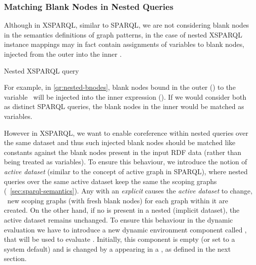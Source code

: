 \subsubsection{Matching Blank Nodes in Nested Queries}
\label{sec:bgpmatch}
%
Although in XSPARQL, similar to SPARQL, we are not considering blank nodes in the semantics definitions of graph
patterns, in the case of nested  XSPARQL instance mappings may in fact contain assignments of
variables to blank nodes, injected from the outer \SparqlForClause into the inner \SparqlForClause.
%
\begin{query}
  \caption{Nested XSPARQL query}%
  \label{qr:nested-bnodes}%
\end{query}
%
\begin{example}
  For example, in \cref{qr:nested-bnodes}, blank nodes bound in the outer \SparqlForClause
  () to the variable~ will be injected into
  the inner \SparqlForClause expression ().
  If we would consider both  as distinct SPARQL queries, the blank nodes in the inner
  \SparqlForClause would be matched as variables.
\end{example}
%
However in XSPARQL, we want to enable coreference within nested queries over the same dataset and thus such injected
blank nodes should be matched like constants against the blank nodes present in the input \ac{RDF} data (rather than
being treated as variables).
%
To ensure this behaviour, we introduce the notion of \emph{active dataset} (similar to the concept of active graph in
SPARQL), where nested queries over the same active dataset keep the same the scoping graphs
(\cf~\cref{sec:sparql-semantics}).
%
Any \SparqlForClause with an \emph{explicit} \DatasetClause causes the \emph{active dataset} to change, \ie~new scoping
graphs (with fresh blank nodes) for each graph within it are created.  On the other hand, if no \DatasetClause is
present in a nested \SparqlForClause (implicit dataset), the active dataset remains
unchanged.
%
To ensure this behaviour in the dynamic evaluation we have to introduce a new dynamic environment component called
, that will be used to evaluate .  Initially, this component is empty (or set
to a system default) and is changed by a \DatasetClause appearing in a \SparqlForClause{}, as defined in the next
section.



